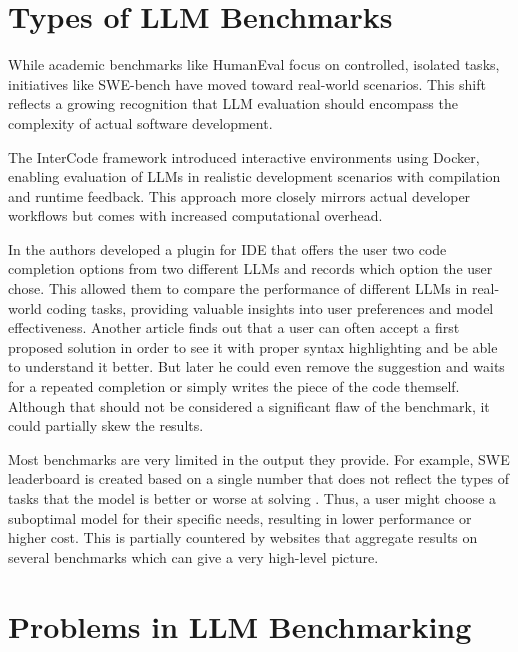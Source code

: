 \section{Types of LLM Benchmarks}


While academic benchmarks like HumanEval focus on controlled, isolated tasks, initiatives like SWE-bench \cite{jimenez2024swebenchlanguagemodelsresolve} have moved toward real-world scenarios. This shift reflects a growing recognition that LLM evaluation should encompass the complexity of actual software development.

The InterCode framework \cite{yang2023intercodestandardizingbenchmarkinginteractive} introduced interactive environments using Docker, enabling evaluation of LLMs in realistic development scenarios with compilation and runtime feedback. This approach more closely mirrors actual developer workflows but comes with increased computational overhead.

In \cite{chi2025copilotarenaplatformcode} the authors developed a plugin for IDE that offers the user two code completion options from two different LLMs and records which option the user chose. This allowed them to compare the performance of different LLMs in real-world coding tasks, providing valuable insights into user preferences and model effectiveness.
Another article \cite{mozannar2024readinglinesmodelinguser} finds out that a user can often accept a first proposed solution in order to see it with proper syntax highlighting and be able to understand it better. But later he could even remove the suggestion and waits for a repeated completion or simply writes the piece of the code themself. Although that should not be considered a significant flaw of the benchmark, it could partially skew the results.

Most benchmarks are very limited in the output they provide. For example, SWE leaderboard \cite{swebenchSWEbenchLeaderboards} is created based on a single number that does not reflect the types of tasks that the model is better or worse at solving \cite{miah2024usercentricevaluationcode}. Thus, a user might choose a suboptimal model for their specific needs, resulting in lower performance or higher cost. This is partially countered by websites that aggregate results on several benchmarks \cite{vellumLeaderboard2025} which can give a very high-level picture.

\section{Problems in LLM Benchmarking}

